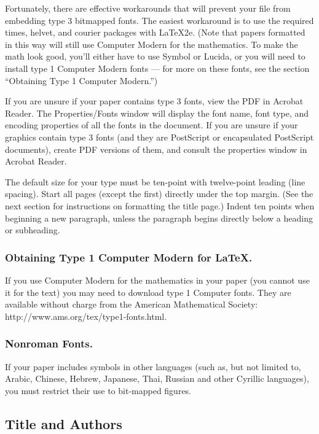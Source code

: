 Fortunately, there are effective workarounds that will prevent your file
from embedding type 3 bitmapped fonts. The easiest workaround is to use
the required times, helvet, and courier packages with \LaTeX{}2e. (Note
that papers formatted in this way will still use Computer Modern for the
mathematics. To make the math look good, you'll either have to use
Symbol or Lucida, or you will need to install type 1 Computer Modern
fonts --- for more on these fonts, see the section ``Obtaining Type 1
Computer Modern.'')

If you are unsure if your paper contains type 3 fonts, view the PDF in
Acrobat Reader. The Properties/Fonts window will display the font name,
font type, and encoding properties of all the fonts in the document. If
you are unsure if your graphics contain type 3 fonts (and they are
PostScript or encapsulated PostScript documents), create PDF versions of
them, and consult the properties window in Acrobat Reader.

The default size for your type must be ten-point with twelve-point
leading (line spacing). Start all pages (except the first) directly
under the top margin. (See the next section for instructions on
formatting the title page.) Indent ten points when beginning a new
paragraph, unless the paragraph begins directly below a heading or
subheading.

\subsubsection{Obtaining Type 1 Computer Modern for \LaTeX{}.}

If you use Computer Modern for the mathematics in your paper (you cannot
use it for the text) you may need to download type 1 Computer fonts.
They are available without charge from the American Mathematical
Society: http://www.ams.org/tex/type1-fonts.html.

\subsubsection{Nonroman Fonts.}

If your paper includes symbols in other languages (such as, but not
limited to, Arabic, Chinese, Hebrew, Japanese, Thai, Russian and other
Cyrillic languages), you must restrict their use to bit-mapped figures.

\subsection{Title and Authors}

